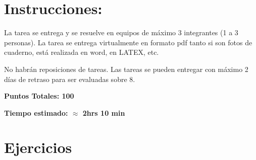 \section*{Instrucciones:}

La tarea se entrega y se resuelve en equipos de máximo 3 integrantes (1 a 3 personas). La tarea se entrega virtualmente en formato pdf tanto si son fotos de cuaderno, está realizada en word, en LATEX, etc.

No habrán reposiciones de tareas. Las tareas se pueden entregar con máximo 2 días de retraso para
ser evaluadas sobre 8.

\textbf{Puntos Totales: 100}

\textbf{Tiempo estimado: $\approx$ 2hrs 10 min}

\section*{Ejercicios}

